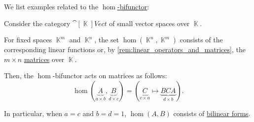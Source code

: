\begin{example}\label{ex:def:hom_bifunctor}
  We list examples related to the \hyperref[def:hom_bifunctor]{\( \hom \)-bifunctor}:
  \begin{thmenum}
     Consider the category \hyperref[def:vector_space/category]{\( \cat[\BbbK]{Vect} \)} of small vector spaces over \( \BbbK \).

    For fixed spaces \( \BbbK^m \) and \( \BbbK^n \), the set \( \hom(\BbbK^n, \BbbK^m) \) consists of the corresponding linear functions or, by \cref{rem:linear_operators_and_matrices}, the \( m \times n \) \hyperref[def:array/matrix]{matrices} over \( \BbbK \).

    Then, the \( \hom \)-bifunctor acts on matrices as follows:
    \begin{equation*}
      \hom(\underbrace{A}_{a \times b}, \underbrace{B}_{d \times c})
      =
      (\underbrace{C}_{c \times a} \mapsto \underbrace{BCA}_{d \times b}).
    \end{equation*}

    In particular, when \( a = c \) and \( b = d = 1 \), \( \hom(A, B) \) consists of \hyperref[def:bilinear_form]{bilinear forms}.
  \end{thmenum}
\end{example}

